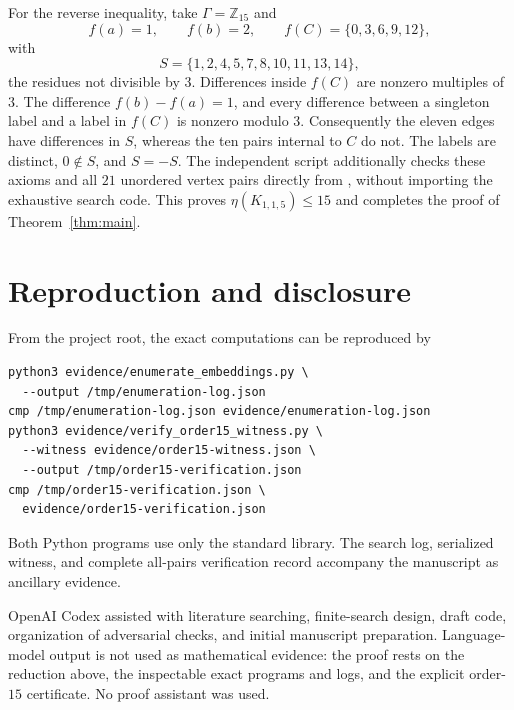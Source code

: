 \documentclass[11pt]{article}
\newcommand{\Z}{\mathbb Z}
\begin{document}
For the reverse inequality, take $\Gamma=\Z_{15}$ and
\[
 f(a)=1,\qquad f(b)=2,\qquad
 f(C)=\{0,3,6,9,12\},
\]
with
\[
 S=\{1,2,4,5,7,8,10,11,13,14\},
\]
the residues not divisible by $3$.  Differences inside $f(C)$ are nonzero
multiples of $3$.  The difference $f(b)-f(a)=1$, and every difference
between a singleton label and a label in $f(C)$ is nonzero modulo $3$.
Consequently the eleven edges have differences in $S$, whereas the ten
pairs internal to $C$ do not.  The labels are distinct, $0\notin S$, and
$S=-S$.  The independent script
 additionally checks these axioms
and all $21$ unordered vertex pairs directly from
, without importing the exhaustive
search code.  This proves $\eta(K_{1,1,5})\leq15$ and completes the proof of
Theorem~\ref{thm:main}.

\section{Reproduction and disclosure}

From the project root, the exact computations can be reproduced by
\begin{verbatim}
python3 evidence/enumerate_embeddings.py \
  --output /tmp/enumeration-log.json
cmp /tmp/enumeration-log.json evidence/enumeration-log.json
python3 evidence/verify_order15_witness.py \
  --witness evidence/order15-witness.json \
  --output /tmp/order15-verification.json
cmp /tmp/order15-verification.json \
  evidence/order15-verification.json
\end{verbatim}
Both Python programs use only the standard library.  The search log,
serialized witness, and complete all-pairs verification record accompany
the manuscript as ancillary evidence.

OpenAI Codex assisted with literature searching, finite-search design,
draft code, organization of adversarial checks, and initial manuscript
preparation.  Language-model output is not used as mathematical evidence:
the proof rests on the reduction above, the inspectable exact programs and
logs, and the explicit order-$15$ certificate.  No proof assistant was
used.



\end{document}
